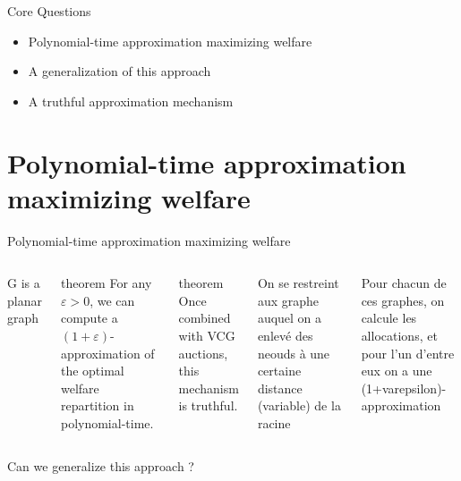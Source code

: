 \documentclass[aspectratio=169]{beamer}
\begin{document}
\begin{frame}{Core Questions}
    \begin{itemize}
        \item Polynomial-time approximation maximizing welfare
        \item A generalization of this approach
        \item A truthful approximation mechanism
    \end{itemize}
\end{frame}

{\section{Polynomial-time approximation maximizing welfare}}

\begin{frame}{Polynomial-time approximation maximizing welfare}
    \begin{columns}
        G is a planar graph

        \begin{block}{theorem}
            For any $\varepsilon > 0$, we can compute a $(1 + \varepsilon)$-approximation of the optimal welfare repartition in polynomial-time.
        \end{block}

        \begin{block}{theorem}
            Once combined with VCG auctions, this mechanism is truthful.
        \end{block}

        On se restreint aux graphe auquel on a enlevé des neouds à une certaine distance (variable) de la racine

        Pour chacun de ces graphes, on calcule les allocations, et pour l'un d'entre eux on a une (1+varepsilon)-approximation


    \end{columns}
\end{frame}

\begin{frame}[standout]
    Can we generalize this approach ?
\end{frame}
\end{document}
